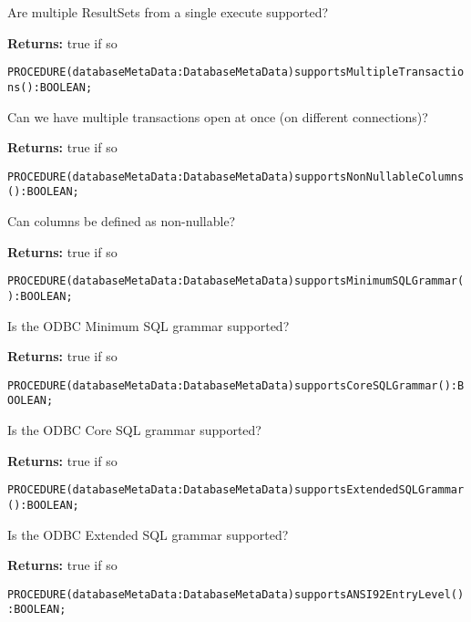 Are multiple ResultSets from a single execute supported? 


{\bf Returns: } 
true if so 




\verb'PROCEDURE(databaseMetaData:DatabaseMetaData)supportsMultipleTransactions():BOOLEAN;'






Can we have multiple transactions open at once (on different connections)? 


{\bf Returns: } 
true if so 




\verb'PROCEDURE(databaseMetaData:DatabaseMetaData)supportsNonNullableColumns():BOOLEAN;'






Can columns be defined as non-nullable?


{\bf Returns: } 
true if so 




\verb'PROCEDURE(databaseMetaData:DatabaseMetaData)supportsMinimumSQLGrammar():BOOLEAN;'






Is the ODBC Minimum SQL grammar supported?


{\bf Returns: } 
true if so 




\verb'PROCEDURE(databaseMetaData:DatabaseMetaData)supportsCoreSQLGrammar():BOOLEAN;'






Is the ODBC Core SQL grammar supported? 


{\bf Returns: } 
true if so 




\verb'PROCEDURE(databaseMetaData:DatabaseMetaData)supportsExtendedSQLGrammar():BOOLEAN;'






Is the ODBC Extended SQL grammar supported? 


{\bf Returns: } 
true if so 




\verb'PROCEDURE(databaseMetaData:DatabaseMetaData)supportsANSI92EntryLevel():BOOLEAN;'






